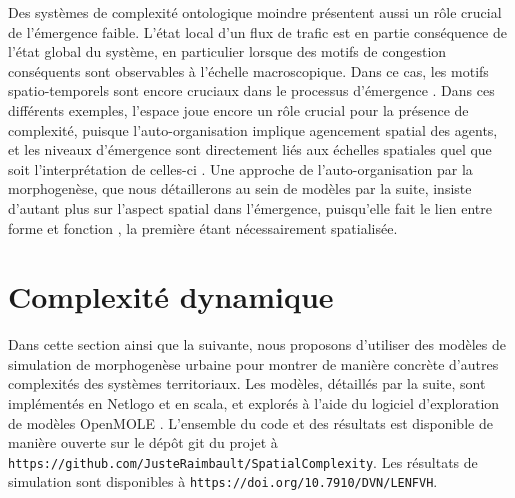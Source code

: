 \documentclass[11pt]{article}
\begin{document}
Des systèmes de complexité ontologique moindre présentent aussi un rôle crucial de l'émergence faible. L'état local d'un flux de trafic est en partie conséquence de l'état global du système, en particulier lorsque des motifs de congestion conséquents sont observables à l'échelle macroscopique. Dans ce cas, les motifs spatio-temporels sont encore cruciaux dans le processus d'émergence \citep{treiber2010three}. Dans ces différents exemples, l'espace joue encore un rôle crucial pour la présence de complexité, puisque l'auto-organisation implique agencement spatial des agents, et les niveaux d'émergence sont directement liés aux échelles spatiales quel que soit l'interprétation de celles-ci \citep{manson2008does}. Une approche de l'auto-organisation par la morphogenèse, que nous détaillerons au sein de modèles par la suite, insiste d'autant plus sur l'aspect spatial dans l'émergence, puisqu'elle fait le lien entre forme et fonction \citep{doursat2012morphogenetic}, la première étant nécessairement spatialisée.






\section{Complexité dynamique}


Dans cette section ainsi que la suivante, nous proposons d'utiliser des modèles de simulation de morphogenèse urbaine pour montrer de manière concrète d'autres complexités des systèmes territoriaux. Les modèles, détaillés par la suite, sont implémentés en Netlogo \cite{wilensky1999netlogo} et en scala, et explorés à l'aide du logiciel d'exploration de modèles OpenMOLE \cite{reuillon2013openmole}. L'ensemble du code et des résultats est disponible de manière ouverte sur le dépôt git du projet à \texttt{https://github.com/JusteRaimbault/SpatialComplexity}. Les résultats de simulation sont disponibles à \texttt{https://doi.org/10.7910/DVN/LENFVH}.


\end{document}
